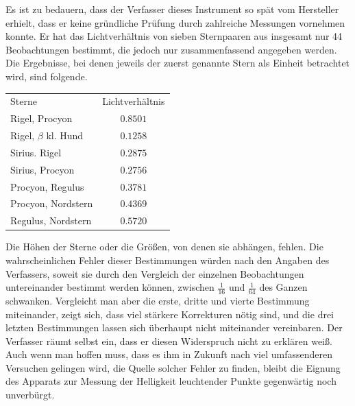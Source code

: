 Es ist zu bedauern, dass der Verfasser dieses Instrument so spät vom Hersteller erhielt, dass er keine gründliche Prüfung durch zahlreiche Messungen vornehmen konnte. Er hat das Lichtverhältnis von sieben Sternpaaren aus insgesamt nur 44 Beobachtungen bestimmt, die jedoch nur zusammenfassend angegeben werden. Die Ergebnisse, bei denen jeweils der zuerst genannte Stern als Einheit betrachtet wird, sind folgende.
\begin{center}
\begin{tabular}{lc}
Sterne & Lichtverhältnis\\[3pt]
Rigel, Procyon & $0.8501$\\
Rigel, $\beta$ kl. Hund & $0.1258$\\
Sirius. Rigel & $0.2875$\\
Sirius, Procyon & $0.2756$\\
Procyon, Regulus & $0.3781$\\
Procyon, Nordstern & $0.4369$\\
Regulus, Nordstern & $0.5720$
\end{tabular}
\end{center}

Die Höhen der Sterne oder die Größen, von denen sie abhängen, fehlen. Die wahrscheinlichen Fehler dieser Bestimmungen würden nach den Angaben des Verfassers, soweit sie durch den Vergleich der einzelnen Beobachtungen untereinander bestimmt werden können, zwischen $\frac{1}{16}$ und $\frac{1}{64}$ des Ganzen schwanken. Vergleicht man aber die erste, dritte und vierte Bestimmung miteinander, zeigt sich, dass viel stärkere Korrekturen nötig sind, und die drei letzten Bestimmungen lassen sich überhaupt nicht miteinander vereinbaren. Der Verfasser räumt selbst ein, dass er diesen Widerspruch nicht zu erklären weiß. Auch wenn man hoffen muss, dass es ihm in Zukunft nach viel umfassenderen Versuchen gelingen wird, die Quelle solcher Fehler zu finden, bleibt die Eignung des Apparats zur Messung der Helligkeit leuchtender Punkte gegenwärtig noch unverbürgt.

